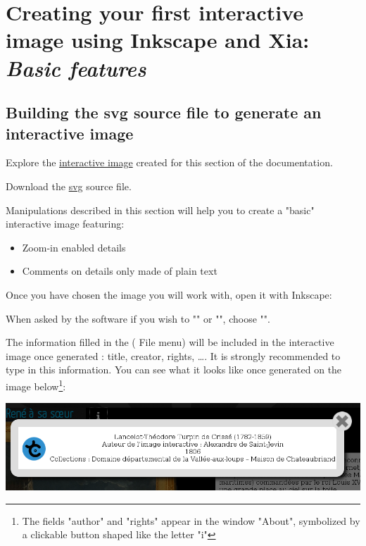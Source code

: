 \section{Creating your first interactive image using Inkscape and Xia: \emph{Basic features}}\label{basic_imageactive}

\subsection{Building the svg source file to generate an interactive image}\label{preparation_svg}

\begin{links}
Explore the \href{http://xia.dane.ac-versailles.fr/demo/tuto/xia1}{interactive image} created for this section of the documentation.

Download the \href{http://xia.dane.ac-versailles.fr/demo/tuto/xia1/svg/xia1.svg}{svg} source file.
\end{links}

Manipulations described in this section will help you to
create a "basic" interactive image featuring:
\begin{itemize}
 \item Zoom-in enabled details
 \item Comments on details only made of plain text
\end{itemize}


Once you have chosen the image you will work with, open it with Inkscape:


When asked by the software if you wish to "" or "", choose "".

The information filled in the  (\chemin
{File} menu) will be included in the interactive image once
generated : title, creator, rights, \ldots. It is strongly recommended to type in this information.
You can see what it looks like once generated on the image below\footnote{The
fields "author" and "rights" appear in the window
"About", symbolized by a clickable button shaped like the letter "i"}:\\

\begin{center}
 \includegraphics[width=\textwidth]{images/titre_ia}\\
\end{center}

